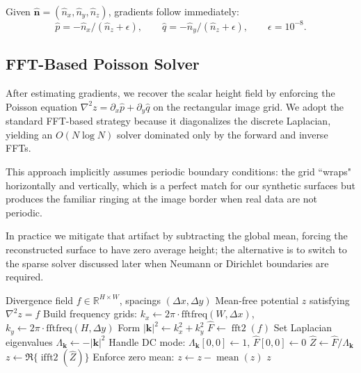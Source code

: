 \documentclass[11pt]{article}
\begin{document}
\noindent Given $\hat{\mathbf{n}} = (\hat{n}_x,\hat{n}_y,\hat{n}_z)$, gradients follow immediately:
\begin{equation}
\hat{p} = -\hat{n}_x / (\hat{n}_z + \epsilon), \qquad
\hat{q} = -\hat{n}_y / (\hat{n}_z + \epsilon), \qquad \epsilon = 10^{-8}.
\end{equation}

\subsection{FFT-Based Poisson Solver}

After estimating gradients, we recover the scalar height field by enforcing the Poisson equation $\nabla^{2}z = \partial_{x}\hat{p}
+ \partial_{y}\hat{q}$ on the rectangular image grid. We adopt the standard FFT-based strategy because it diagonalizes the discrete
Laplacian, yielding an $O(N\log N)$ solver dominated only by the forward and inverse FFTs. 

This approach implicitly assumes periodic boundary conditions: the grid ``wraps" horizontally and vertically, which is a perfect match for our synthetic surfaces but produces the
familiar ringing at the image border when real data are not periodic. 

In practice we mitigate that artifact by subtracting the global
mean, forcing the reconstructed surface to have zero average height; the alternative is to switch to the sparse solver discussed later
when Neumann or Dirichlet boundaries are required.

\begin{algorithm}[H]
\caption{FFT-Based Poisson Equation Solver}
\begin{algorithmic}[1]
\REQUIRE Divergence field $f \in \mathbb{R}^{H \times W}$, spacings $(\Delta x,\Delta y)$
\ENSURE Mean-free potential $z$ satisfying $\nabla^2 z = f$
\STATE Build frequency grids: $k_x \leftarrow 2\pi \cdot \text{fftfreq}(W,\Delta x)$, $k_y \leftarrow 2\pi \cdot \text{fftfreq}(H,\Delta
y)$
\STATE Form $|\mathbf{k}|^2 \leftarrow k_x^2 + k_y^2$
\STATE $\hat{F} \leftarrow \operatorname{fft2}(f)$
\STATE Set Laplacian eigenvalues $\Lambda_{\mathbf{k}} \leftarrow -|\mathbf{k}|^2$
\STATE Handle DC mode: $\Lambda_{\mathbf{k}}[0,0] \leftarrow 1$, $\hat{F}[0,0] \leftarrow 0$
\STATE $\hat{Z} \leftarrow \hat{F} / \Lambda_{\mathbf{k}}$
\STATE $z \leftarrow \Re\{\operatorname{ifft2}(\hat{Z})\}$
\STATE Enforce zero mean: $z \leftarrow z - \operatorname{mean}(z)$
\RETURN $z$
\end{algorithmic}
\end{algorithm}
\end{document}
